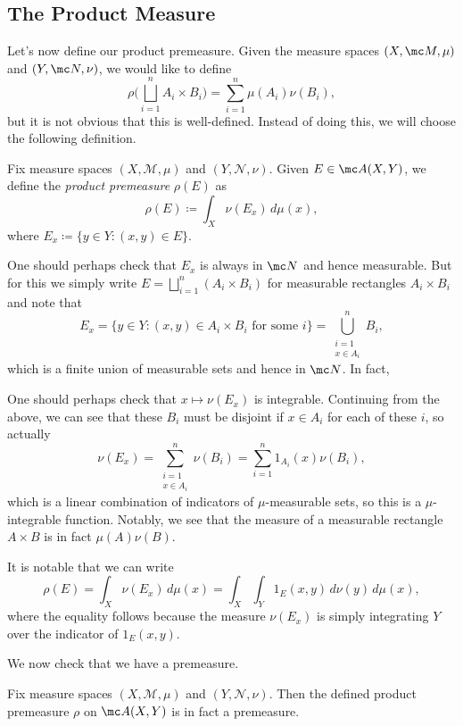 \documentclass[../notes.tex]{subfiles}
\begin{document}
\subsection{The Product Measure}
Let's now define our product premeasure. Given the measure spaces $(X,\mc M,\mu)$ and $(Y,\mc N,\nu)$, we would like to define
\[\rho\Bigg(\bigsqcup_{i=1}^nA_i\times B_i\Bigg)=\sum_{i=1}^n\mu(A_i)\nu(B_i),\]
but it is not obvious that this is well-defined. Instead of doing this, we will choose the following definition.
\begin{definition} \label{def:product-premeas}
	Fix measure spaces $(X,\mathcal M,\mu)$ and $(Y,\mathcal N,\nu)$. Given $E\in\mc A(X,Y)$, we define the \textit{product premeasure} $\rho(E)$ as
	\[\rho(E)\coloneqq\int_X\nu(E_x)\,d\mu(x),\]
	where $E_x\coloneqq\{y\in Y:(x,y)\in E\}$.
\end{definition}
\begin{remark}
	One should perhaps check that $E_x$ is always in $\mc N$ and hence measurable. But for this we simply write $E=\bigsqcup_{i=1}^n(A_i\times B_i)$ for measurable rectangles $A_i\times B_i$ and note that
	\[E_x=\{y\in Y:(x,y)\in A_i\times B_i\text{ for some }i\}=\bigcup_{\substack{i=1\\x\in A_i}}^nB_i,\]
	which is a finite union of measurable sets and hence in $\mc N$. In fact, 
\end{remark}
\begin{remark} \label{rem:meas-rect}
	One should perhaps check that $x\mapsto\nu(E_x)$ is integrable. Continuing from the above, we can see that these $B_i$ must be disjoint if $x\in A_i$ for each of these $i$, so actually
	\[\nu(E_x)=\sum_{\substack{i=1\\x\in A_i}}^n\nu(B_i)=\sum_{i=1}^n1_{A_i}(x)\nu(B_i),\]
	which is a linear combination of indicators of $\mu$-measurable sets, so this is a $\mu$-integrable function. Notably, we see that the measure of a measurable rectangle $A\times B$ is in fact $\mu(A)\nu(B)$.
\end{remark}
\begin{remark} \label{rem:double-int-premeasure}
	It is notable that we can write
	\[\rho(E)=\int_X\nu(E_x)\,d\mu(x)=\int_X\int_Y1_{E}(x,y)\,d\nu(y)\,d\mu(x),\]
	where the equality follows because the measure $\nu(E_x)$ is simply integrating $Y$ over the indicator of $1_E(x,y)$.
\end{remark}
We now check that we have a premeasure.
\begin{proposition}
	Fix measure spaces $(X,\mathcal M,\mu)$ and $(Y,\mathcal N,\nu)$. Then the defined product premeasure $\rho$ on $\mc A(X,Y)$ is in fact a premeasure.
\end{proposition}
\end{document}

